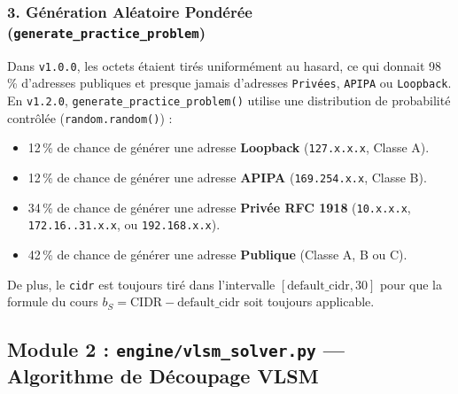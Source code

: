 \documentclass[11pt,a4paper]{article}
\begin{document}
\subsubsection{3. Génération Aléatoire Pondérée (\texttt{generate\_practice\_problem})}
Dans \texttt{v1.0.0}, les octets étaient tirés uniformément au hasard, ce qui donnait 98\,\% d'adresses publiques et presque jamais d'adresses \texttt{Privées}, \texttt{APIPA} ou \texttt{Loopback}. En \texttt{v1.2.0}, \texttt{generate\_practice\_problem()} utilise une distribution de probabilité contrôlée (\texttt{random.random()}) :
\begin{itemize}
    \item 12\,\% de chance de générer une adresse \textbf{Loopback} (\texttt{127.x.x.x}, Classe A).
    \item 12\,\% de chance de générer une adresse \textbf{APIPA} (\texttt{169.254.x.x}, Classe B).
    \item 34\,\% de chance de générer une adresse \textbf{Privée RFC 1918} (\texttt{10.x.x.x}, \texttt{172.16..31.x.x}, ou \texttt{192.168.x.x}).
    \item 42\,\% de chance de générer une adresse \textbf{Publique} (Classe A, B ou C).
\end{itemize}
De plus, le \texttt{cidr} est toujours tiré dans l'intervalle $[\text{default\_cidr}, 30]$ pour que la formule du cours $b_S = \text{CIDR} - \text{default\_cidr}$ soit toujours applicable.

\newpage
\subsection{Module 2 : \texttt{engine/vlsm\_solver.py} — Algorithme de Découpage VLSM}
\end{document}
